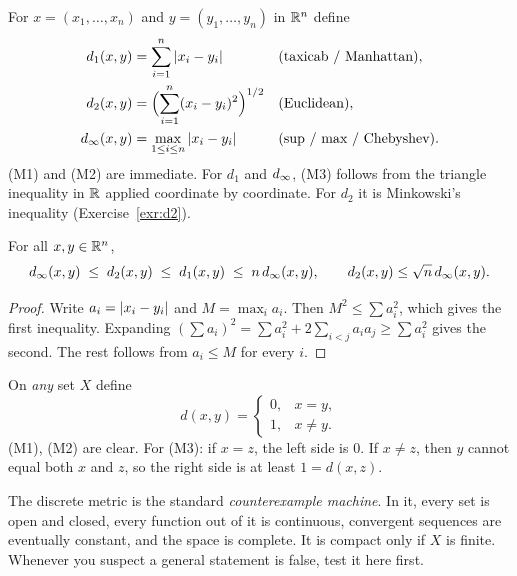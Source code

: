 \begin{example}\label{ex:Rn}
For $x=(x_1,\dots,x_n)$ and $y=(y_1,\dots,y_n)$ in $\mathbb{R}^n$ define
\begin{align*}
  d_1(x,y) &= \sum_{i=1}^n \left\lvert x_i-y_i\right\rvert &&\text{(taxicab / Manhattan)},\\
  d_2(x,y) &= \Bigl(\sum_{i=1}^n (x_i-y_i)^2\Bigr)^{1/2} &&\text{(Euclidean)},\\
  d_\infty(x,y) &= \max_{1\le i\le n}\left\lvert x_i-y_i\right\rvert &&\text{(sup / max / Chebyshev)}.
\end{align*}
\textup{(M1)} and \textup{(M2)} are immediate. For $d_1$ and $d_\infty$, \textup{(M3)} follows from the triangle inequality in $\mathbb{R}$ applied coordinate by coordinate. For $d_2$ it is Minkowski's inequality (Exercise~\ref{exr:d2}).
\end{example}

\begin{proposition}\label{prop:Rn-compare}
For all $x,y\in\mathbb{R}^n$,
\[
  d_\infty(x,y)\;\le\; d_2(x,y)\;\le\; d_1(x,y)\;\le\; n\,d_\infty(x,y),
  \qquad
  d_2(x,y)\le\sqrt{n}\,d_\infty(x,y).
\]
\end{proposition}
\begin{proof}
Write $a_i=\left\lvert x_i-y_i\right\rvert$ and $M=\max_i a_i$. Then $M^2\le\sum a_i^2$, which gives the first inequality. Expanding $(\sum a_i)^2=\sum a_i^2+2\sum_{i<j}a_ia_j\ge\sum a_i^2$ gives the second. The rest follows from $a_i\le M$ for every $i$.
\end{proof}

\begin{example}\label{ex:discrete}
On \emph{any} set $X$ define
\[
  d(x,y)=\begin{cases}0,& x=y,\\ 1,& x\ne y.\end{cases}
\]
\textup{(M1)}, \textup{(M2)} are clear. For \textup{(M3)}: if $x=z$, the left side is $0$. If $x\ne z$, then $y$ cannot equal both $x$ and $z$, so the right side is at least $1=d(x,z)$.
\end{example}

\begin{warning}
The discrete metric is the standard \emph{counterexample machine}. In it, every set is open and closed, every function out of it is continuous, convergent sequences are eventually constant, and the space is complete. It is compact only if $X$ is finite. Whenever you suspect a general statement is false, test it here first.
\end{warning}


